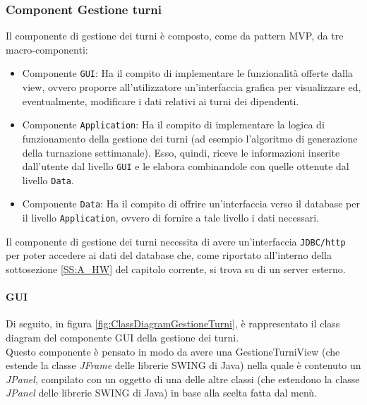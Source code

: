 \subsubsection{Component Gestione turni}
Il componente di gestione dei turni è composto, come da pattern MVP, da tre macro-componenti:
\begin{itemize}
	\item Componente \verb|GUI|: Ha il compito di implementare le funzionalità offerte dalla view, ovvero proporre all'utilizzatore un'interfaccia grafica per visualizzare ed, eventualmente, modificare i dati relativi ai turni dei dipendenti.
	\item Componente \verb|Application|: Ha il compito di implementare la logica di funzionamento della gestione dei turni (ad esempio l'algoritmo di generazione della turnazione settimanale). Esso, quindi, riceve le informazioni inserite dall'utente dal livello \verb|GUI| e le elabora combinandole con quelle ottenute dal livello \verb|Data|.
	\item Componente \verb|Data|: Ha il compito di offrire un'interfaccia verso il database per il livello \verb|Application|, ovvero di fornire a tale livello i dati necessari.
\end{itemize}
Il componente di gestione dei turni necessita di avere un'interfaccia \verb|JDBC/http| per poter accedere ai dati del database che, come riportato all'interno della sottosezione \ref{SS:A_HW} del capitolo corrente, si trova su di un server esterno.
\paragraph{GUI}
Di seguito, in figura \ref{fig:ClassDiagramGestioneTurni}, è rappresentato il class diagram del componente GUI della gestione dei turni.\\
Questo componente è pensato in modo da avere una GestioneTurniView (che estende la classe \textit{JFrame} delle librerie SWING di Java) nella quale è contenuto un \textit{JPanel}, compilato con un oggetto di una delle altre classi (che estendono la classe \textit{JPanel} delle librerie SWING di Java) in base alla scelta fatta dal menù.
